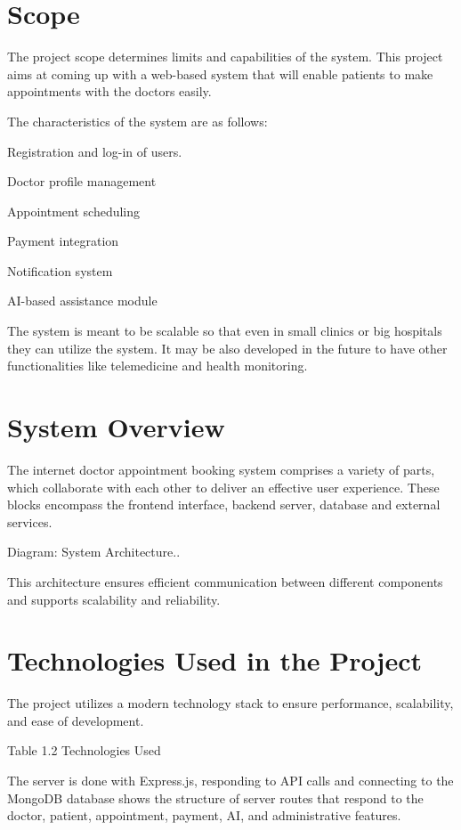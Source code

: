\section{Scope}

The project scope determines limits and capabilities of the system. This project aims at coming up with a web-based system that will enable patients to make appointments with the doctors easily.

The characteristics of the system are as follows:

Registration and log-in of users.

Doctor profile management

Appointment scheduling

Payment integration

Notification system

AI-based assistance module

The system is meant to be scalable so that even in small clinics or big hospitals they can utilize the system. It may be also developed in the future to have other functionalities like telemedicine and health monitoring.

\section{System Overview}

The internet doctor appointment booking system comprises a variety of parts, which collaborate with each other to deliver an effective user experience. These blocks encompass the frontend interface, backend server, database and external services.

Diagram: System Architecture..

This architecture ensures efficient communication between different components and supports scalability and reliability.

\section{Technologies Used in the Project}

The project utilizes a modern technology stack to ensure performance, scalability, and ease of development.

Table 1.2 Technologies Used

The server is done with Express.js, responding to API calls and connecting to the MongoDB database shows the structure of server routes that respond to the doctor, patient, appointment, payment, AI, and administrative features.

